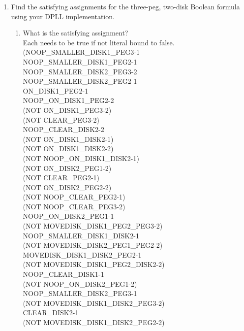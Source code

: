 \documentclass[12pt,letterpaper]{ntdhw}
\begin{document}
\begin{enumerate}
  \item Find the satisfying assignments for the three-peg, two-disk
    Boolean formula using your DPLL implementation.
    \begin{enumerate}
    \item What is the satisfying assignment?
       \\Each needs to be true if not literal bound to false.
\\(NOOP\_SMALLER\_DISK1\_PEG3\mbox{-}1 
\\NOOP\_SMALLER\_DISK1\_PEG2\mbox{-}1 
\\NOOP\_SMALLER\_DISK2\_PEG3\mbox{-}2
\\NOOP\_SMALLER\_DISK2\_PEG2\mbox{-}1 
\\ON\_DISK1\_PEG2\mbox{-}1 
\\NOOP\_ON\_DISK1\_PEG2\mbox{-}2
\\(NOT ON\_DISK1\_PEG3\mbox{-}2) 
\\(NOT CLEAR\_PEG3\mbox{-}2) 
\\NOOP\_CLEAR\_DISK2\mbox{-}2
\\(NOT ON\_DISK1\_DISK2\mbox{-}1) 
\\(NOT ON\_DISK1\_DISK2\mbox{-}2) 
\\(NOT NOOP\_ON\_DISK1\_DISK2\mbox{-}1)
\\(NOT ON\_DISK2\_PEG1\mbox{-}2) 
\\(NOT CLEAR\_PEG2\mbox{-}1) 
\\(NOT ON\_DISK2\_PEG2\mbox{-}2)
\\(NOT NOOP\_CLEAR\_PEG2\mbox{-}1) 
\\(NOT NOOP\_CLEAR\_PEG3\mbox{-}2) 
\\NOOP\_ON\_DISK2\_PEG1\mbox{-}1
\\(NOT MOVEDISK\_DISK1\_PEG2\_PEG3\mbox{-}2) 
\\NOOP\_SMALLER\_DISK1\_DISK2\mbox{-}1
\\(NOT MOVEDISK\_DISK2\_PEG1\_PEG2\mbox{-}2) 
\\MOVEDISK\_DISK1\_DISK2\_PEG2\mbox{-}1
\\(NOT MOVEDISK\_DISK1\_PEG2\_DISK2\mbox{-}2) 
\\NOOP\_CLEAR\_DISK1\mbox{-}1
\\(NOT NOOP\_ON\_DISK2\_PEG1\mbox{-}2) 
\\NOOP\_SMALLER\_DISK2\_PEG3\mbox{-}1
\\(NOT MOVEDISK\_DISK1\_DISK2\_PEG3\mbox{-}2) 
\\CLEAR\_DISK2\mbox{-}1
\\(NOT MOVEDISK\_DISK1\_DISK2\_PEG2\mbox{-}2) 

\end{enumerate}
\end{enumerate}
\end{document}
